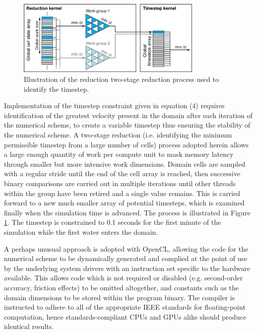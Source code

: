 \documentclass[11pt,english,a4paper]{article}
\begin{document}
\begin{figure}[tpb]
\centering
\includegraphics[width=0.8\textwidth]{Figure2.png}
\caption{Illustration of the reduction two-stage reduction process used to identify the timestep.}
\label{ReductionDiagram}
\end{figure}

Implementation of the timestep constraint given in equation (4) requires identification of the greatest velocity present in the domain after each iteration of the numerical scheme, to create a variable timestep thus ensuring the stability of the numerical scheme. A two-stage reduction (i.e. identifying the minimum permissible timestep from a large number of cells) process adopted herein allows a large enough quantity of work per compute unit to mask memory latency through smaller but more intensive work dimensions. Domain cells are sampled with a regular stride until the end of the cell array is reached, then successive binary comparisons are carried out in multiple iterations until other threads within the group have been retired and a single value remains. This is carried forward to a new much smaller array of potential timesteps, which is examined finally when the simulation time is advanced. The process is illustrated in Figure \ref{ReductionDiagram}. The timestep is constrained to 0.1 seconds for the first minute of the simulation while the first water enters the domain. 

A perhaps unusual approach is adopted with OpenCL, allowing the code for the numerical scheme to be dynamically generated and complied at the point of use by the underlying system drivers with an instruction set specific to the hardware available. This allows code which is not required or disabled (e.g. second-order accuracy, friction effects) to be omitted altogether, and constants such as the domain dimensions to be stored within the program binary. The compiler is instructed to adhere to all of the appropriate IEEE standards for floating-point computation, hence standards-compliant CPUs and GPUs alike should produce identical results.
\end{document}
